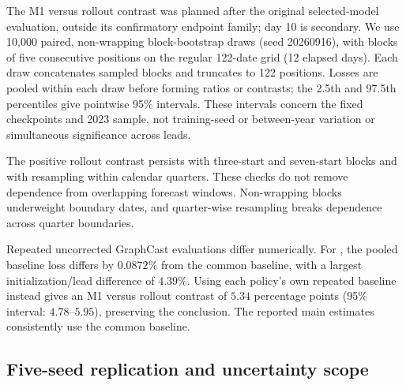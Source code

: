 \documentclass{article}
\newcommand{\vfourchange}[1]{{\color{blue}#1}}
\newcommand{\vfourred}[1]{{\color{red}#1}}
\newif\ifvfivechanges
\newcommand{\vfiveidentity}[1]{#1}
\DeclareRobustCommand{\vfiveadded}[1]{\ifvfivechanges{\color{vfiveAdded}%
  \let\vfourchange\vfiveidentity\let\vfourred\vfiveidentity#1}\else{\color{blue}%
  \let\vfourchange\vfiveidentity\let\vfourred\vfiveidentity#1}\fi}
\DeclareRobustCommand{\vfiveRone}[1]{\ifvfivechanges{\color{vfiveDeleted}\sout{#1}}\,\fi\vfiveadded{R1}}
\begin{document}
\ifvfivechanges
\par\begingroup\color{vfiveDeleted}\noindent
\sout{The M1 versus matched reset/reset rollout contrast is a separate planned analysis added after the original selected-model evaluation; it is not part of that evaluation's original confirmatory endpoint family. Day 10 is a secondary endpoint. We resample complete paired forecasts using 10,000 non-wrapping block-bootstrap draws with seed 20260916 and blocks of five consecutive initialization positions (12 elapsed days). Intervals for reductions, contrasts, and leadwise curves are pointwise 95\% intervals, conditional on the fixed checkpoints and the 2023 sample. They do not measure training-seed or between-year variation, or establish simultaneous significance across leads.}
\par\endgroup
\fi
\vfourchange{The M1 versus \vfiveRone{reset/reset} rollout contrast was planned after the original selected-model evaluation, outside its confirmatory endpoint family; day 10 is secondary. We use 10,000 paired, non-wrapping block-bootstrap draws (seed 20260916), with blocks of five consecutive positions on the regular 122-date grid (12 elapsed days). Each draw concatenates sampled blocks and truncates to 122 positions. Losses are pooled within each draw before forming ratios or contrasts; the 2.5th and 97.5th percentiles give pointwise 95\% intervals. These intervals concern the fixed checkpoints and 2023 sample, not training-seed or between-year variation or simultaneous significance across leads.}

\vfourchange{The positive rollout contrast persists with three-start and seven-start blocks and with resampling within calendar quarters. These checks do not remove dependence from overlapping forecast windows. Non-wrapping blocks underweight boundary dates, and quarter-wise resampling breaks dependence across quarter boundaries.}

\vfourchange{Repeated uncorrected GraphCast evaluations differ numerically. For \vfiveRone{reset/reset}, the pooled baseline loss differs by $0.0872\%$ from the common baseline, with a largest initialization/lead difference of $4.39\%$. Using each policy's own repeated baseline instead gives an M1 versus \vfiveRone{reset/reset} rollout contrast of $5.34$ percentage points (95\% interval: $4.78$--$5.95$), preserving the conclusion. The reported main estimates consistently use the common baseline.}



\subsection{\vfourchange{Five-seed replication and uncertainty scope}}
\label{app:seed_replication}
\end{document}
